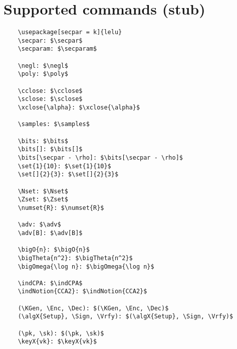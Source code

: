 \documentclass{article}
\begin{document}
\section{Supported commands (stub)}

\begin{lstlisting}
    \usepackage[secpar = k]{lelu}
    \secpar: $\secpar$
    \secparam: $\secparam$

    \negl: $\negl$
    \poly: $\poly$

    \cclose: $\cclose$
    \sclose: $\sclose$
    \xclose{\alpha}: $\xclose{\alpha}$ 

    \samples: $\samples$

    \bits: $\bits$
    \bits[]: $\bits[]$
    \bits[\secpar - \rho]: $\bits[\secpar - \rho]$
    \set{1}{10}: $\set{1}{10}$
    \set[]{2}{3}: $\set[]{2}{3}$

    \Nset: $\Nset$
    \Zset: $\Zset$
    \numset{R}: $\numset{R}$

    \adv: $\adv$
    \adv[B]: $\adv[B]$

    \bigO{n}: $\bigO{n}$
    \bigTheta{n^2}: $\bigTheta{n^2}$ 
    \bigOmega{\log n}: $\bigOmega{\log n}$ 

    \indCPA: $\indCPA$
    \indNotion{CCA2}: $\indNotion{CCA2}$

    (\KGen, \Enc, \Dec): $(\KGen, \Enc, \Dec)$
    (\algX{Setup}, \Sign, \Vrfy): $(\algX{Setup}, \Sign, \Vrfy)$

    (\pk, \sk): $(\pk, \sk)$
    \keyX{vk}: $\keyX{vk}$
\end{lstlisting}
\end{document}
